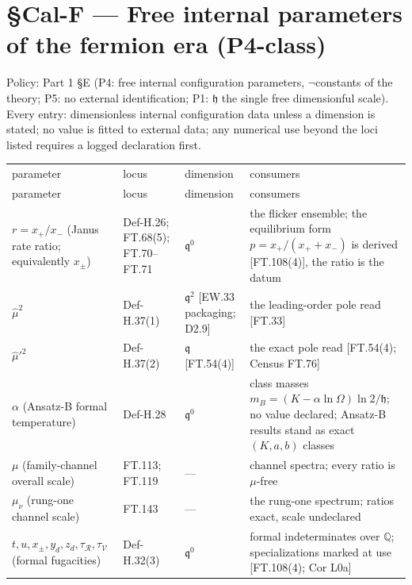 \section[§Cal-F — Free internal parameters of the fermion era…]{\texorpdfstring{§Cal-F — Free internal parameters of the fermion era (P4-class)}{SCal-F - Free internal parameters of the fermion era (P4-class)}}

Policy: Part 1 §E (P4: free internal configuration parameters, $\neg$constants of the theory; P5: no external identification; P1: $\mathfrak h$ the single free dimensionful scale). Every entry: dimensionless internal configuration data unless a dimension is stated; no value is fitted to external data; any numerical use beyond the loci listed requires a logged declaration first.

{\scriptsize\setlength{\tabcolsep}{4pt}
\begin{longtable}{>{\raggedright\arraybackslash}p{}|>{\raggedright\arraybackslash}p{}|>{\raggedright\arraybackslash}p{}|>{\raggedright\arraybackslash}p{}}
\toprule
parameter & locus & dimension & consumers \\
\addlinespace[2pt]
\midrule
\endfirsthead
\toprule
parameter & locus & dimension & consumers \\
\addlinespace[2pt]
\midrule
\endhead
\bottomrule
\endlastfoot
$r=\allowbreak x_+\allowbreak /x_-$ (Janus rate ratio; equivalently $x_\pm$) & Def-H.26; FT.68(5); FT.70–FT.71 & $\mathfrak q^0$ & the flicker ensemble; the equilibrium form $p=\allowbreak x_+\allowbreak /(x_+\allowbreak +\allowbreak x_-)$ is derived [FT.108(4)], the ratio is the datum \\
$\hat\mu^2$ & Def-H.37(1) & $\mathfrak q^2$ [EW.33 packaging; D2.9] & the leading-order pole read [FT.33] \\
$\hat\mu'^2$ & Def-H.37(2) & $\mathfrak q$ [FT.54(4)] & the exact pole read [FT.54(4); Census FT.76] \\
$\alpha$ (Ansatz-B formal temperature) & Def-H.28 & $\mathfrak q^0$ & class masses $m_B=\allowbreak (K-\alpha\ln\Omega)\ln2/\mathfrak h$; no value declared; Ansatz-B results stand as exact $(K,\allowbreak a,\allowbreak b)$ classes \\
$\mu$ (family-channel overall scale) & FT.113; FT.119 & — & channel spectra; every ratio is $\mu$-free \\
$\mu_\nu$ (rung-one channel scale) & FT.143 & — & the rung-one spectrum; ratios exact, scale undeclared \\
$t,\allowbreak u,\allowbreak x_\pm,\allowbreak y_d,\allowbreak z_d,\allowbreak \tau_{\mathcal R},\allowbreak \tau_{\mathcal V}$ (formal fugacities) & Def-H.32(3) & $\mathfrak q^0$ & formal indeterminates over $\mathbb Q$; specializations marked at use [FT.108(4); Cor L0a] \\
\end{longtable}
}


